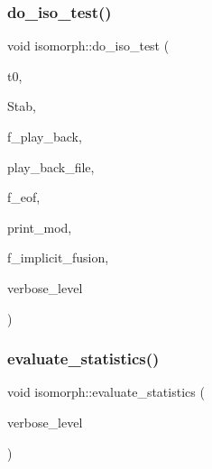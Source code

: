 \subsubsection{\texorpdfstring{do\+\_\+iso\+\_\+test()}{do\_iso\_test()}}
{\footnotesize\ttfamily void isomorph\+::do\+\_\+iso\+\_\+test (\begin{DoxyParamCaption}\item[{\mbox{\hyperlink{galois_8h_a09fddde158a3a20bd2dcadb609de11dc}{I\+NT}}}]{t0,  }\item[{\mbox{\hyperlink{classsims}{sims}} $\ast$\&}]{Stab,  }\item[{\mbox{\hyperlink{galois_8h_a09fddde158a3a20bd2dcadb609de11dc}{I\+NT}}}]{f\+\_\+play\+\_\+back,  }\item[{ifstream $\ast$}]{play\+\_\+back\+\_\+file,  }\item[{\mbox{\hyperlink{galois_8h_a09fddde158a3a20bd2dcadb609de11dc}{I\+NT}} \&}]{f\+\_\+eof,  }\item[{\mbox{\hyperlink{galois_8h_a09fddde158a3a20bd2dcadb609de11dc}{I\+NT}}}]{print\+\_\+mod,  }\item[{\mbox{\hyperlink{galois_8h_a09fddde158a3a20bd2dcadb609de11dc}{I\+NT}}}]{f\+\_\+implicit\+\_\+fusion,  }\item[{\mbox{\hyperlink{galois_8h_a09fddde158a3a20bd2dcadb609de11dc}{I\+NT}}}]{verbose\+\_\+level }\end{DoxyParamCaption})}

\mbox{\label{classisomorph_ade4cdca1757163cda5a1ff58a75da284}} 
\subsubsection{\texorpdfstring{evaluate\+\_\+statistics()}{evaluate\_statistics()}}
{\footnotesize\ttfamily void isomorph\+::evaluate\+\_\+statistics (\begin{DoxyParamCaption}\item[{\mbox{\hyperlink{galois_8h_a09fddde158a3a20bd2dcadb609de11dc}{I\+NT}}}]{verbose\+\_\+level }\end{DoxyParamCaption})}

\mbox{\label{classisomorph_a2bb9a84e0b53e2eef9066d8faaab82b0}} 
